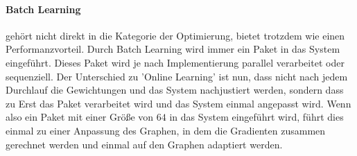 \paragraph{Batch Learning} gehört nicht direkt in die Kategorie der Optimierung, bietet trotzdem wie einen Performanzvorteil. 
Durch Batch Learning wird immer ein Paket in das System eingeführt. 
Dieses Paket wird je nach Implementierung parallel verarbeitet oder sequenziell. 
Der Unterschied zu 'Online Learning' ist nun, dass nicht nach jedem Durchlauf die Gewichtungen und das System nachjustiert werden, sondern dass zu Erst das Paket verarbeitet wird und das System einmal angepasst wird. 
Wenn also ein Paket mit einer Größe von $64$ in das System eingeführt wird, führt dies einmal zu einer Anpassung des Graphen, in dem die Gradienten zusammen gerechnet werden und einmal auf den Graphen adaptiert werden. \cite{AI3}






